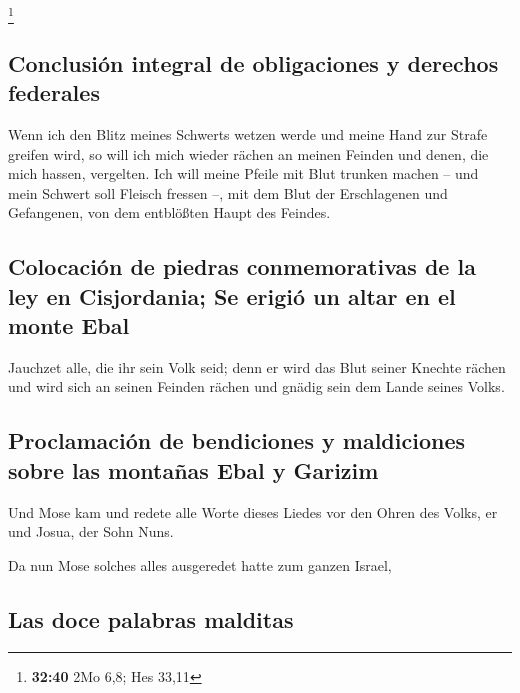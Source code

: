 \footnote{\textbf{32:40} 2Mo 6,8; Hes 33,11}

\hypertarget{conclusiuxf3n-integral-de-obligaciones-y-derechos-federales}{%
\subsection{Conclusión integral de obligaciones y derechos
federales}\label{conclusiuxf3n-integral-de-obligaciones-y-derechos-federales}}

 Wenn ich den Blitz meines Schwerts wetzen werde und
meine Hand zur Strafe greifen wird, so will ich mich wieder rächen an
meinen Feinden und denen, die mich hassen, vergelten. 
Ich will meine Pfeile mit Blut trunken machen -- und mein Schwert soll
Fleisch fressen --, mit dem Blut der Erschlagenen und Gefangenen, von
dem entblößten Haupt des Feindes.

\hypertarget{colocaciuxf3n-de-piedras-conmemorativas-de-la-ley-en-cisjordania-se-erigiuxf3-un-altar-en-el-monte-ebal}{%
\subsection{Colocación de piedras conmemorativas de la ley en
Cisjordania; Se erigió un altar en el monte
Ebal}\label{colocaciuxf3n-de-piedras-conmemorativas-de-la-ley-en-cisjordania-se-erigiuxf3-un-altar-en-el-monte-ebal}}

 Jauchzet alle, die ihr sein Volk seid; denn er wird das
Blut seiner Knechte rächen und wird sich an seinen Feinden rächen und
gnädig sein dem Lande seines Volks.

\hypertarget{proclamaciuxf3n-de-bendiciones-y-maldiciones-sobre-las-montauxf1as-ebal-y-garizim}{%
\subsection{Proclamación de bendiciones y maldiciones sobre las montañas
Ebal y
Garizim}\label{proclamaciuxf3n-de-bendiciones-y-maldiciones-sobre-las-montauxf1as-ebal-y-garizim}}

 Und Mose kam und redete alle Worte dieses Liedes vor den
Ohren des Volks, er und Josua, der Sohn Nuns.

 Da nun Mose solches alles ausgeredet hatte zum ganzen
Israel,

\hypertarget{las-doce-palabras-malditas}{%
\subsection{Las doce palabras
malditas}\label{las-doce-palabras-malditas}}

